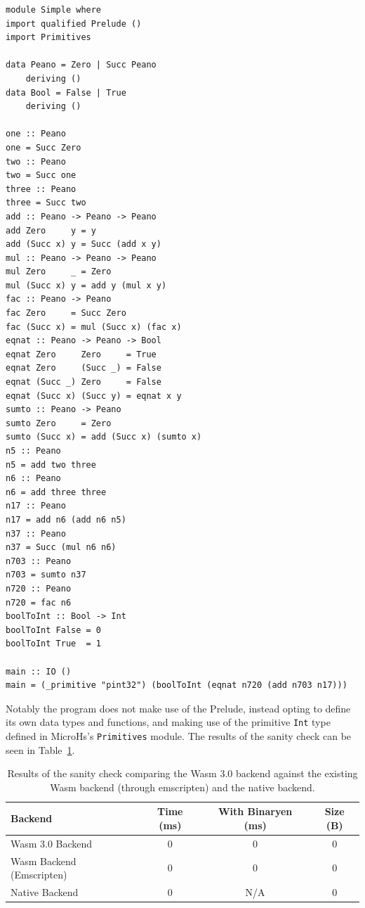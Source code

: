 \begin{verbatim}
module Simple where
import qualified Prelude ()
import Primitives

data Peano = Zero | Succ Peano
    deriving ()
data Bool = False | True
    deriving ()

one :: Peano
one = Succ Zero
two :: Peano
two = Succ one
three :: Peano
three = Succ two
add :: Peano -> Peano -> Peano
add Zero     y = y
add (Succ x) y = Succ (add x y)
mul :: Peano -> Peano -> Peano
mul Zero     _ = Zero
mul (Succ x) y = add y (mul x y)
fac :: Peano -> Peano
fac Zero     = Succ Zero
fac (Succ x) = mul (Succ x) (fac x)
eqnat :: Peano -> Peano -> Bool
eqnat Zero     Zero     = True
eqnat Zero     (Succ _) = False
eqnat (Succ _) Zero     = False
eqnat (Succ x) (Succ y) = eqnat x y
sumto :: Peano -> Peano
sumto Zero     = Zero
sumto (Succ x) = add (Succ x) (sumto x)
n5 :: Peano
n5 = add two three
n6 :: Peano
n6 = add three three
n17 :: Peano
n17 = add n6 (add n6 n5)
n37 :: Peano
n37 = Succ (mul n6 n6)
n703 :: Peano
n703 = sumto n37
n720 :: Peano
n720 = fac n6
boolToInt :: Bool -> Int
boolToInt False = 0
boolToInt True  = 1

main :: IO ()
main = (_primitive "pint32") (boolToInt (eqnat n720 (add n703 n17)))
\end{verbatim}

Notably the program does not make use of the Prelude, instead opting to define its own data types and functions, and making use of the primitive \verb|Int| type defined in MicroHs's \verb|Primitives| module. The results of the sanity check can be seen in Table~\ref{tab:sanity_check_results}.
\begin{table}[h]
    \centering
    \begin{tabular}{|l|c|c|c|}
        \hline
        \textbf{Backend} & \textbf{Time (ms)} & \textbf{With Binaryen (ms)} & \textbf{Size (B)} \\
        \hline
        Wasm 3.0 Backend & 0 & 0 & 0 \\
        Wasm Backend (Emscripten) & 0 & 0 & 0 \\
        Native Backend & 0 & N/A & 0 \\
        \hline
    \end{tabular}
    \caption{Results of the sanity check comparing the Wasm 3.0 backend against the existing Wasm backend (through emscripten) and the native backend.}
    \label{tab:sanity_check_results}
\end{table}